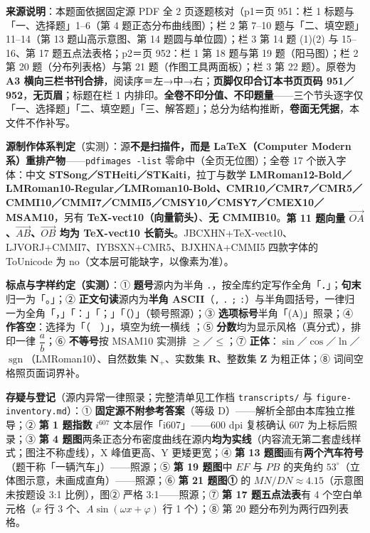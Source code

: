 


\begin{gktip}
\textbf{来源说明}：本题面依据固定源 PDF 全 2 页逐题核对（p1＝页 951：栏 1 标题与「一、选择题」1–6（第 4 题正态分布曲线图）；栏 2 第 7–10 题与「二、填空题」11–14（第 13 题山高示意图、第 14 题圆与单位圆）；栏 3 第 14 题 (1)(2) 与 15–16、第 17 题五点法表格；p2＝页 952：栏 1 第 18 题与第 19 题（阳马图）；栏 2 第 20 题（分布列表格）与第 21 题（作图工具两面板）；栏 3 第 22 题）。原卷为 \textbf{A3 横向三栏书刊合排}，阅读序＝左→中→右；\textbf{页脚仅印合订本书页页码 951／952}，\textbf{无页眉}；标题在栏 1 内排印。\textbf{全卷不印分值、不印题量}——三个节头逐字仅「一、选择题」「二、填空题」「三、解答题」；总分为结构推断，\textbf{卷面无凭据}，本文件不作补写。

\textbf{源制作体系判定}（实测）：源\textbf{不是扫描件，而是 LaTeX（Computer Modern 系）重排产物}——\texttt{pdfimages -list} 零命中（全页无位图）；全卷 17 个嵌入字体：中文 \textbf{STSong／STHeiti／STKaiti}，拉丁与数学 \textbf{LMRoman12-Bold／LMRoman10-Regular／LMRoman10-Bold、CMR10／CMR7／CMR5／CMMI10／CMMI7／CMMI5／CMSY10／CMSY7／CMEX10／MSAM10}，另有 \textbf{TeX-vect10（向量箭头）}、\textbf{无 CMMIB10}。\textbf{第 11 题向量 \(\overrightarrow{OA}\)、\(\overrightarrow{AB}\)、\(\overrightarrow{OB}\) 均为 TeX-vect10 长箭头}。JBCXHN+TeX-vect10、LJVORJ+CMMI7、IYBSXN+CMR5、BJXHNA+CMMI5 四款字体的 ToUnicode 为 no（文本层可能缺字，以像素为准）。

\textbf{标点与字样约定（实测）}：① \textbf{题号}源内为半角 \texttt{.}，按全库约定写作全角「．」；\textbf{句末}归一为「。」；② \textbf{正文句读}源内为\textbf{半角 ASCII}（\texttt{,} \texttt{.} \texttt{;} \texttt{:}）与半角圆括号，一律归一为全角「，」「：」「；」「（）」（顿号照源）；③ \textbf{选项标号}半角「(A)」照录；④ \textbf{作答空}：选择为「（　）」，填空为统一横线 \texttt{\gkblank{}}；⑤ \textbf{分数}均为显示风格（真分式），排印一律 \(\dfrac{a}{b}\)；⑥ \textbf{不等号}按 MSAM10 实测排 \(\geqslant\)／\(\leqslant\)；⑦ \textbf{正体}：\(\sin\)／\(\cos\)／\(\ln\)／\(\operatorname{sgn}\)（LMRoman10）、自然数集 \(\mathbf{N}_+\)、实数集 \(\mathbf{R}\)、整数集 \(\mathbf{Z}\) 为粗正体；⑧ 词间空格照页面词界补。

\textbf{存疑与登记}（源内异常一律照录；完整清单见工作档 \texttt{transcripts/} 与 \texttt{figure-inventory.md}）：① \textbf{固定源不附参考答案}（等级 D）——解析全部由本库独立推导；② \textbf{第 1 题指数} \(i^{607}\) 文本层作「i607」——600 dpi 复核确认 607 为上标后照录；③ \textbf{第 4 题图}两条正态分布密度曲线在源内\textbf{均为实线}（内容流无第二套虚线样式；图注不称虚线），X 峰值更高、Y 更矮更宽；④ \textbf{第 13 题图}画有\textbf{两个汽车符号}（题干称「一辆汽车」）——照源；⑤ \textbf{第 19 题图}中 \(EF\) 与 \(PB\) 的夹角约 \(53^\circ\)（立体图示意，未画成直角）——照源；⑥ \textbf{第 21 题图①} 的 \(MN/DN\approx4.15\)（示意图未按题设 3:1 比例），图② 严格 3:1——照源；⑦ \textbf{第 17 题五点法表}有 4 个空白单元格（\(x\) 行 3 个、\(A\sin(\omega x+\varphi)\) 行 1 个）；⑧ 第 20 题分布列为两行四列表格。
\end{gktip}


